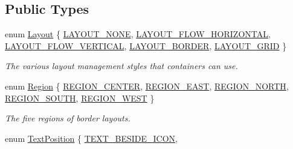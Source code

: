 \subsection*{Public Types}
\begin{DoxyCompactItemize}
\item 
enum \mbox{\hyperlink{classsgl_1_1GContainer_a1b7da28ed84c0763e8f92cde2df4799b}{Layout}} \{ \mbox{\hyperlink{classsgl_1_1GContainer_a1b7da28ed84c0763e8f92cde2df4799bac7afd1f77438e15d91d69c735a3a909a}{L\+A\+Y\+O\+U\+T\+\_\+\+N\+O\+NE}}, 
\mbox{\hyperlink{classsgl_1_1GContainer_a1b7da28ed84c0763e8f92cde2df4799bac89a811e02b929a18f7f34e7d3bebd63}{L\+A\+Y\+O\+U\+T\+\_\+\+F\+L\+O\+W\+\_\+\+H\+O\+R\+I\+Z\+O\+N\+T\+AL}}, 
\mbox{\hyperlink{classsgl_1_1GContainer_a1b7da28ed84c0763e8f92cde2df4799ba31e93ff7f38812816b05d254e04228e3}{L\+A\+Y\+O\+U\+T\+\_\+\+F\+L\+O\+W\+\_\+\+V\+E\+R\+T\+I\+C\+AL}}, 
\mbox{\hyperlink{classsgl_1_1GContainer_a1b7da28ed84c0763e8f92cde2df4799babce8e871f79a8c9085d90c968d8827de}{L\+A\+Y\+O\+U\+T\+\_\+\+B\+O\+R\+D\+ER}}, 
\mbox{\hyperlink{classsgl_1_1GContainer_a1b7da28ed84c0763e8f92cde2df4799bac4b094ed4f8bf75f60ba2235771371c3}{L\+A\+Y\+O\+U\+T\+\_\+\+G\+R\+ID}}
 \}
\begin{DoxyCompactList}\small\item\em The various layout management styles that containers can use. \end{DoxyCompactList}\item 
enum \mbox{\hyperlink{classsgl_1_1GContainer_a81a01a86de31071a92e6cce0bab9bc4b}{Region}} \{ \mbox{\hyperlink{classsgl_1_1GContainer_a81a01a86de31071a92e6cce0bab9bc4ba5ba85a564dbf472d69f92d5a2870db16}{R\+E\+G\+I\+O\+N\+\_\+\+C\+E\+N\+T\+ER}}, 
\mbox{\hyperlink{classsgl_1_1GContainer_a81a01a86de31071a92e6cce0bab9bc4baac78951bd4e01d20f4825d5ae0a54357}{R\+E\+G\+I\+O\+N\+\_\+\+E\+A\+ST}}, 
\mbox{\hyperlink{classsgl_1_1GContainer_a81a01a86de31071a92e6cce0bab9bc4baf40d135fb811ad59acb102f1fb357550}{R\+E\+G\+I\+O\+N\+\_\+\+N\+O\+R\+TH}}, 
\mbox{\hyperlink{classsgl_1_1GContainer_a81a01a86de31071a92e6cce0bab9bc4bab533512ba438173a4ceb9c501eb17628}{R\+E\+G\+I\+O\+N\+\_\+\+S\+O\+U\+TH}}, 
\mbox{\hyperlink{classsgl_1_1GContainer_a81a01a86de31071a92e6cce0bab9bc4ba5dd8c2219af001263c00de02b642786d}{R\+E\+G\+I\+O\+N\+\_\+\+W\+E\+ST}}
 \}
\begin{DoxyCompactList}\small\item\em The five regions of border layouts. \end{DoxyCompactList}\item 
enum \mbox{\hyperlink{classsgl_1_1GInteractor_a8e0d441725a81d2bbdebbea09078260e}{Text\+Position}} \{ \mbox{\hyperlink{classsgl_1_1GInteractor_a8e0d441725a81d2bbdebbea09078260ea4cd6f2e7d5a08d6f4dc052df2358f774}{T\+E\+X\+T\+\_\+\+B\+E\+S\+I\+D\+E\+\_\+\+I\+C\+ON}}, 

\end{DoxyCompactItemize}
